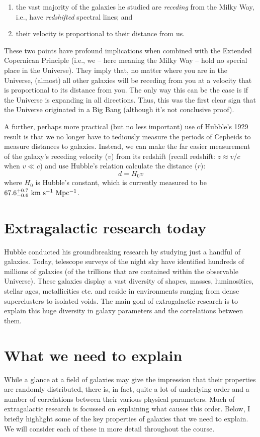 \documentclass[11pt]{article}
\begin{document}
\begin{enumerate}
\item the vast majority of the galaxies he studied are {\it receding} from
the Milky Way, i.e., have {\it redshifted} spectral lines; and 
\item their velocity is proportional to their distance from us.
\end{enumerate}
These two points have profound implications when combined with the
Extended Copernican Principle (i.e., we -- here meaning the Milky Way
-- hold no special place in the Universe). They imply that, no matter
where you are in the Universe, (almost) all other galaxies will be
receding from you at a velocity that is proportional to its distance
from you. The only way this can be the case is if the Universe is
expanding in all directions. Thus, this was the first clear sign that
the Universe originated in a Big Bang (although it's not conclusive
proof).

A further, perhaps more practical (but no less important) use of
Hubble's 1929 result is that we no longer have to tediously measure
the periods of Cepheids to measure distances to galaxies. Instead, we
can make the far easier measurement of the galaxy's receding velocity
($v$) from its redshift (recall redshift: $z\approx v/c$ when $v\ll c$)
and use Hubble's relation calculate the distance ($r$):
\begin{equation}
d = H_0 v
\end{equation}
where $H_0$ is Hubble's constant, which is currently measured to be
$67.6^{+0.7}_{-0.6}~{\rm km~s^{-1}~Mpc^{-1}}$.

\section{Extragalactic research today}
Hubble conducted his groundbreaking research by studying just a
handful of galaxies. Today, telescope surveys of the night sky have
identified hundreds of millions of galaxies (of the trillions that are
contained within the observable Universe). These galaxies display a
vast diversity of shapes, masses, luminosities, stellar ages,
metallicities etc. and reside in environments ranging from dense
superclusters to isolated voids. The main goal of extragalactic
research is to explain this huge diversity in galaxy parameters and
the correlations between them.

\section{What we need to explain} 
While a glance at a field of galaxies may give the impression that
their properties are randomly distributed, there is, in fact, quite a
lot of underlying order and a number of correlations between their
various physical parameters. Much of extragalactic research is
focussed on explaining what causes this order. Below, I briefly
highlight some of the key properties of galaxies that we need to
explain. We will consider each of these in more detail throughout the
course.
\end{document}
